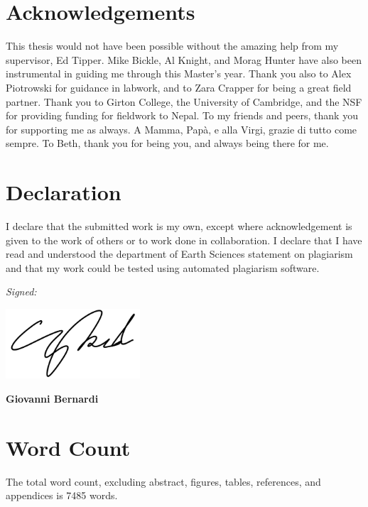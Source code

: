 \documentclass[hidelinks, 12pt]{article} %
\newcommand{\bsk}{\vspace{\baselineskip}}
\begin{document}

\newpage


\tableofcontents


\newpage


\section*{Acknowledgements}
This thesis would not have been possible without the amazing help from my supervisor, Ed Tipper. Mike Bickle, Al Knight, and Morag Hunter have also been instrumental in guiding me through this Master's year. Thank you also to Alex Piotrowski for guidance in labwork, and to Zara Crapper for being a great field partner. Thank you to Girton College, the University of Cambridge, and the NSF for providing funding for fieldwork to Nepal. To my friends and peers, thank you for supporting me as always. A Mamma, Papà, e alla Virgi, grazie di tutto come sempre. To Beth, thank you for being you, and always being there for me.


\section*{Declaration}

I declare that the submitted work is my own, except where acknowledgement is given to the work of others or to work done in collaboration. I declare that I have read and understood the department of Earth Sciences statement on plagiarism and that my work could be tested using automated plagiarism software.

\bsk

\hfill \textit{Signed:}\phantom{hellohel}
\vspace{0.5cm}
  \begin{flushright}
    \includegraphics[width=5cm]{signature.png} \\ 
  \end{flushright}
  \hfill \textbf{Giovanni Bernardi}\phantom{hel}


\section*{Word Count}
The total word count, excluding abstract, figures, tables, references, and appendices is 7485 words.
\end{document}
